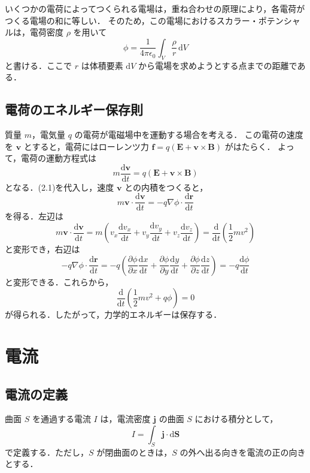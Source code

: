 \documentclass[11pt, a4paper]{ltjsarticle}
\numberwithin{equation}{section}
\begin{document}
いくつかの電荷によってつくられる電場は，重ね合わせの原理により，各電荷がつくる電場の和に等しい．
そのため，この電場におけるスカラー・ポテンシャルは，電荷密度 $\rho$ を用いて
\begin{equation}
  \phi = \frac{1}{4 \pi \epsilon_0} \int_V \frac{\rho}{r} \, \mathrm{d}{V}
\end{equation}
と書ける．ここで $r$ は体積要素 $\mathrm{d}V$ から電場を求めようとする点までの距離である．

\subsection{電荷のエネルギー保存則}
質量 $m$，電気量 $q$ の電荷が電磁場中を運動する場合を考える．
この電荷の速度を $\bm{v}$ とすると，電荷にはローレンツ力 $\bm{f} = q \left( \bm{E} + \bm{v} \times \bm{B} \right)$ がはたらく．
よって，電荷の運動方程式は
\[
  m \frac{\mathrm{d}\bm{v}}{\mathrm{d}t} = q \left( \bm{E} + \bm{v} \times \bm{B} \right)
\]
となる．(2.1)を代入し，速度 $\bm{v}$ との内積をつくると，
\[
  m \bm{v} \cdot \frac{\mathrm{d}\bm{v}}{\mathrm{d}t} = -q \nabla \phi \cdot \frac{\mathrm{d}\bm{r}}{\mathrm{d}t}
\]  
を得る．左辺は
\[
  m \bm{v} \cdot \frac{\mathrm{d}\bm{v}}{\mathrm{d}t} = m \left( v_x \frac{\mathrm{d} v_x}{\mathrm{d} t} + v_y \frac{\mathrm{d} v_y}{\mathrm{d} t} + v_z \frac{\mathrm{d} v_z}{\mathrm{d} t} \right) = \frac{\mathrm{d}}{\mathrm{d} t} \left( \frac{1}{2} m v^{2} \right)
\]
と変形でき，右辺は
\[
  -q \nabla \phi \cdot \frac{\mathrm{d}\bm{r}}{\mathrm{d}t} = -q \left( \frac{\partial \phi}{\partial x} \frac{\mathrm{d}x}{\mathrm{d}t} + \frac{\partial \phi}{\partial y} \frac{\mathrm{d}y}{\mathrm{d}t} + \frac{\partial \phi}{\partial z} \frac{\mathrm{d}z}{\mathrm{d}t} \right) = -q \frac{\mathrm{d} \phi}{\mathrm{d} t}
\]
と変形できる．これらから，
\[
  \frac{\mathrm{d}}{\mathrm{d}t} \left( \frac{1}{2} m v^2 + q\phi \right) = 0
\]
が得られる．したがって，力学的エネルギーは保存する．

\section{電流}
\subsection{電流の定義}
曲面 $S$ を通過する電流 $I$ は，電流密度 $\bm{j}$ の曲面 $S$ における積分として，
\[
  I = \int_S \bm{j} \cdot \mathrm{d}\bm{S}
\]
で定義する．ただし，$S$ が閉曲面のときは，$S$ の外へ出る向きを電流の正の向きとする．
\end{document}
